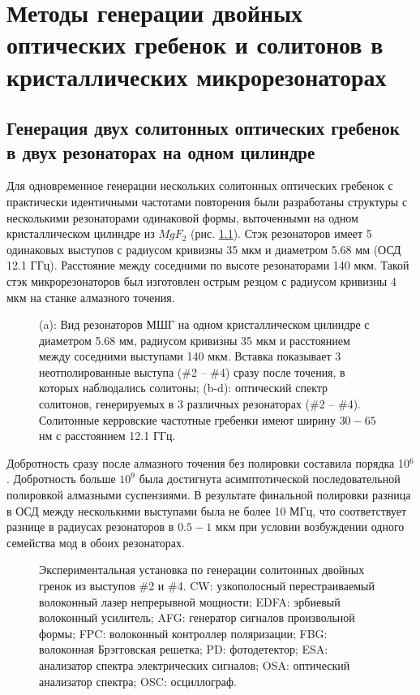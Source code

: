\chapter{Методы генерации двойных оптических гребенок и солитонов в кристаллических микрорезонаторах} \label{chapt4}

\section{Генерация двух солитонных оптических гребенок в двух резонаторах на одном цилиндре}

Для одновременное генерации нескольких солитонных оптических гребенок \cite{Pavlov2017} с практически идентичными частотами повторения были разработаны структуры с несколькими резонаторами одинаковой формы, выточенными на одном кристаллическом цилиндре из $MgF_2$ (рис. \ref{ris:image1}). Стэк резонаторов имеет 5 одинаковых выступов с радиусом кривизны 35 мкм и диаметром 5.68 мм (ОСД 12.1 ГГц). Расстояние между соседними по высоте резонаторами 140 мкм. Такой стэк микрорезонаторов был изготовлен острым резцом с радиусом кривизны 4 мкм на станке алмазного точения.

\begin{figure}[ht]
\begin{minipage}[ht]{1\linewidth}
\end{minipage}
\caption{ (a): Вид резонаторов МШГ на одном кристаллическом цилиндре с диаметром 5.68 мм, радиусом кривизны 35 мкм и расстоянием между соседними выступами 140 мкм. Вставка показывает 3 неотполированные выступа (\#2 -- \#4) сразу после точения, в которых наблюдались солитоны; (b-d): оптический спектр солитонов, генерируемых в 3 различных резонаторах (\#2 -- \#4). Солитонные керровские частотные гребенки имеют ширину $30 - 65$ нм с расстоянием 12.1 ГГц.}
\label{ris:image1}
\end{figure}

Добротность сразу после алмазного точения без полировки составила порядка 10$^6$. Добротность больше $10^9$ была достигнута асимптотической последовательной полировкой алмазными суспензиями. В результате финальной полировки разница в ОСД между несколькими выступами была не более 10 МГц, что соответствует разнице в радиусах резонаторов в $0.5 - 1$ мкм при условии возбуждении одного семейства мод в обоих резонаторах.

\begin{figure}[ht]
\begin{minipage}[ht]{1\linewidth}
\end{minipage}
\caption{Экспериментальная установка по генерации солитонных двойных гренок из выступов \#2 и \#4. CW: узкополосный перестраиваемый волоконный лазер непрерывной мощности; EDFA: эрбиевый волоконный усилитель; AFG: генератор сигналов произвольной формы; FPC:  волоконный контроллер поляризации; FBG: волоконная Брэгговская решетка; PD: фотодетектор; ESA: анализатор спектра электрических сигналов; OSA: оптический анализатор спектра; OSC: осциллограф.}
\label{ris:image2}
\end{figure}

